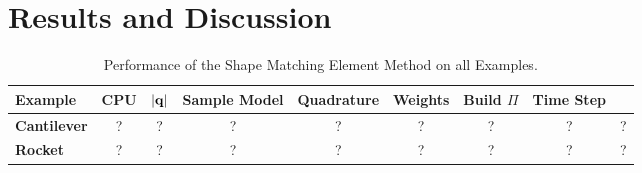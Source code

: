 %
\section{Results and Discussion}



\begin{table}[h]
  \caption{Performance of the Shape Matching Element Method on all Examples.}
  \label{tbl:compare}
  \begin{center}
  \begin{tabular}{l c c c c c c c c}
   \textbf{Example} & \textbf{CPU} & $|\mathbf{q}|$ &  \textbf{Sample Model} & \textbf{Quadrature} & \textbf{Weights} & \textbf{Build $\Pi$} & \textbf{Time Step} \\
   \hline 
   \rowcolor[HTML]{DAE8FC} 
   \textbf{Cantilever}  & ? & ? & ? & ? & ? & ? & ? & ? \\
   \textbf{Rocket}      & ? & ? & ? & ? & ? & ? & ? & ? \\
   \hline
  \end{tabular}
  \end{center}
  
  \end{table}

